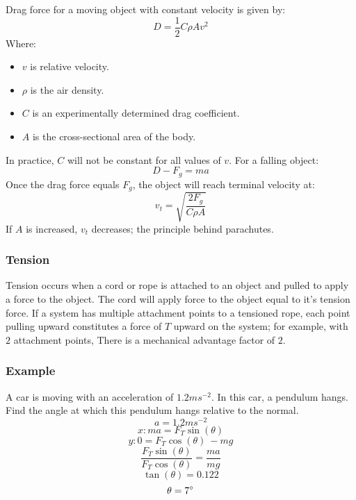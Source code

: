 \documentclass[12pt]{report}
\begin{document}
\begin{flushleft}
\bigskip
Drag force for a moving object with constant velocity is given by:
\[D = \frac{1}{2}C\rho Av^2\]
Where:
\begin{itemize}
    \item \(v\) is relative velocity.
    \item \(\rho\) is the air density.
    \item \(C\) is an experimentally determined drag coefficient.
    \item \(A\) is the cross-sectional area of the body.
\end{itemize}
In practice, \(C\) will not be constant for all values of \(v\).
For a falling object:
\[D - F_g = ma\]
Once the drag force equals \(F_g\), the object will reach terminal velocity at:
\[v_t = \sqrt{\frac{2F_g}{C\rho A}}\]
If \(A\) is increased, \(v_t\) decreases; the principle behind parachutes.

\subsubsection*{Tension}
Tension occurs when a cord or rope is attached to an object and pulled to apply a force to
the object. The cord will apply force to the object equal to it's tension force.
If a system has multiple attachment points to a tensioned rope, each point pulling upward
constitutes a force of \(T\) upward on the system; for example, with \(2\) attachment points, There
is a mechanical advantage factor of \(2\).

\subsubsection*{Example}
A car is moving with an acceleration of \(1.2ms^{-2}\). In this car, a pendulum hangs. Find
the angle at which this pendulum hangs relative to the normal.
\[a = 1.2ms^{-2}\]
\[x: ma = F_T\sin(\theta)\]
\[y: 0 = F_T\cos(\theta)\ - mg\]
\[\frac{F_T\sin(\theta)}{F_T\cos(\theta)} = \frac{ma}{mg}\]
\[\tan(\theta) = 0.122\]
\[\theta = 7\degree\]

\end{flushleft}
\end{document}

